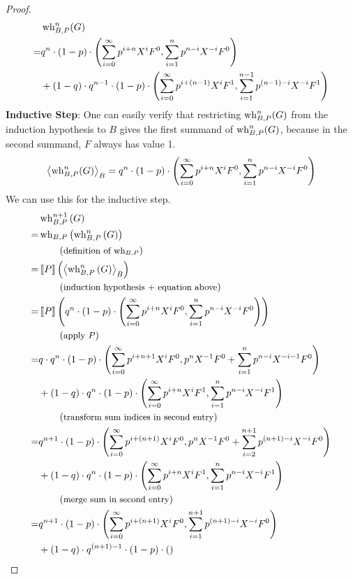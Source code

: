 \begin{lemma}
\begin{proof}
\begin{align*}
			 & \operatorname{wh}_{B, P}^n(G) \\
			=& q^n \cdot (1-p) \cdot \left( 
			 	\sum_{i=0}^{\infty} p^{i+n} X^i F^0,
			 	\sum_{i=1}^{n} p^{n-i} X^{-i} F^0 \right) \\
			 & + (1-q) \cdot q^{n-1} \cdot (1-p) \cdot \left( 
			 	\sum_{i=0}^{\infty} p^{i+(n-1)} X^i F^1,
			 	\sum_{i=1}^{n-1} p^{(n-1)-i} X^{-i} F^1 \right)
		\end{align*}
		\textbf{Inductive Step}:
		One can easily verify that restricting $\operatorname{wh}_{B, P}^n(G)$ from the induction hypothesis to $B$ gives the first summand of $\operatorname{wh}_{B, P}^n(G)$, because in the second summand, $F$ always has value 1.
		\[ \left\langle \operatorname{wh}_{B, P}^n(G) \right\rangle_{B} = q^n \cdot (1-p) \cdot \left( 
			\sum_{i=0}^{\infty} p^{i+n} X^i F^0, \sum_{i=1}^{n} p^{n-i} X^{-i} F^0 \right) \]
		We can use this for the inductive step.
		\begin{align*}
			 & \operatorname{wh}_{B, P}^{n+1}\left( G \right) \\
			=& \operatorname{wh}_{B, P}\left( \operatorname{wh}_{B, P}^n\left( G \right) \right) \\
			 & \hspace*{2em} \left(\text{\small definition of $\operatorname{wh}_{B, P}$}\right) \\
			=& \left\llbracket P \right\rrbracket\left( \left\langle  \operatorname{wh}_{B, P}^n\left( G \right)  \right\rangle_{B} \right) \\
			 & \hspace*{2em} \left(\text{\small induction hypothesis + equation above}\right) \\
			=& \left\llbracket P \right\rrbracket\left( q^n \cdot (1-p) \cdot \left( 
			 	\sum_{i=0}^{\infty} p^{i+n} X^i F^0,
			 	\sum_{i=1}^{n} p^{n-i} X^{-i} F^0 \right) \right) \\
			 & \hspace*{2em} \left(\text{\small apply $P$}\right) \\
			=& q \cdot q^n \cdot (1-p) \cdot \left( 
				\sum_{i=0}^{\infty} p^{i+n+1} X^i F^0,
				p^n X^{-1} F^0 + \sum_{i=1}^{n} p^{n-i} X^{-i-1} F^0  \right) \\
			 & + (1-q) \cdot q^n \cdot (1-p) \cdot \left( 
			 	\sum_{i=0}^{\infty} p^{i+n} X^i F^1,
			 	 \sum_{i=1}^{n} p^{n-i} X^{-i} F^1  \right) \\
			 & \hspace*{2em} \left(\text{\small transform sum indices in second entry}\right) \\
			=& q^{n+1} \cdot (1-p) \cdot \left( 
				\sum_{i=0}^{\infty} p^{i+(n+1)} X^i F^0,
				p^n X^{-1} F^0 + \sum_{i=2}^{n+1} p^{(n+1)-i} X^{-i} F^0  \right) \\
			 & + (1-q) \cdot q^n \cdot (1-p) \cdot \left( 
				\sum_{i=0}^{\infty} p^{i+n} X^i F^1,
				\sum_{i=1}^{n} p^{n-i} X^{-i} F^1  \right) \\
			 & \hspace*{2em} \left(\text{\small merge sum in second entry}\right) \\
			=& q^{n+1} \cdot (1-p) \cdot \left( 
				\sum_{i=0}^{\infty} p^{i+(n+1)} X^i F^0,
				\sum_{i=1}^{n+1} p^{(n+1)-i} X^{-i} F^0  \right) \\
			& + (1-q) \cdot q^{(n+1)-1} \cdot (1-p) \cdot \left( 
 \right)
\end{align*}
\end{proof}
\end{lemma}
